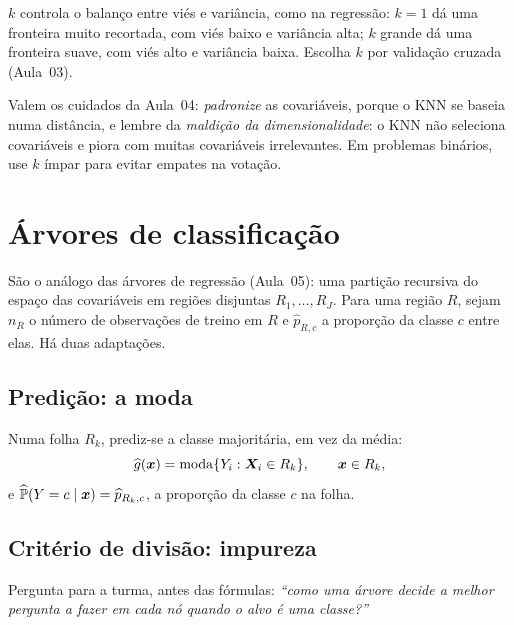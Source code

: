 \documentclass[11pt,a4paper]{article}
\begin{document}
\begin{ideia}
$k$ controla o balanço entre viés e variância, como na regressão: $k=1$ dá uma
fronteira muito recortada, com viés baixo e variância alta; $k$ grande dá uma
fronteira suave, com viés alto e variância baixa. Escolha $k$ por validação cruzada
(Aula~03).
\end{ideia}

\begin{atencao}
Valem os cuidados da Aula~04: \emph{padronize} as covariáveis, porque o KNN se baseia
numa distância, e lembre da \emph{maldição da dimensionalidade}: o KNN não seleciona
covariáveis e piora com muitas covariáveis irrelevantes. Em problemas binários, use
$k$ ímpar para evitar empates na votação.
\end{atencao}

\section{Árvores de classificação}
São o análogo das árvores de regressão (Aula~05): uma partição recursiva do espaço das
covariáveis em regiões disjuntas $R_1,\dots,R_J$. Para uma região $R$, sejam $n_R$ o
número de observações de treino em $R$ e $\widehat p_{R,c}$ a proporção da classe $c$
entre elas. Há duas adaptações.

\subsection{Predição: a moda}
Numa folha $R_k$, prediz-se a classe majoritária, em vez da média:
\begin{equation}\label{eq:arvcls}
  \widehat{g}(\bm{x}) = \operatorname{moda}\{Y_i : \bm{X}_i\in R_k\},\qquad \bm{x}\in R_k,
\end{equation}
e $\widehat{\mathbb{P}}(Y=c\mid\bm{x})=\widehat p_{R_k,c}$, a proporção da classe $c$ na folha.

\subsection{Critério de divisão: impureza}
\begin{emsala}
Pergunta para a turma, antes das fórmulas: \emph{``como uma árvore decide a melhor
pergunta a fazer em cada nó quando o alvo é uma classe?''}
\end{emsala}
\end{document}
